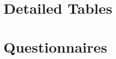 \newpage
\makeappendices
\begin{appendices}
	\section{Detailed Tables}
	\label{Detailed Tables}
	\begin{doublespace}
	\end{doublespace}

	\newpage
	\section{Questionnaires}
	\label{Questionnaires}
	\begin{doublespace}
	\end{doublespace}
\end{appendices}
